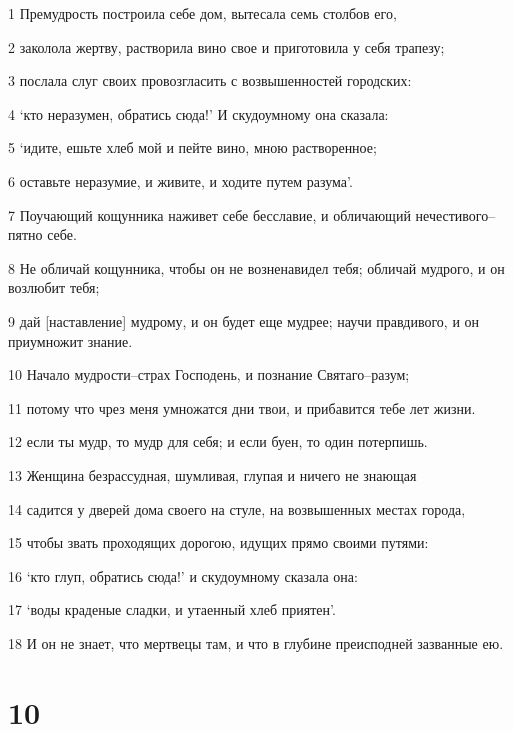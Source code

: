 \par 1 Премудрость построила себе дом, вытесала семь столбов его,
\par 2 заколола жертву, растворила вино свое и приготовила у себя трапезу;
\par 3 послала слуг своих провозгласить с возвышенностей городских:
\par 4 `кто неразумен, обратись сюда!' И скудоумному она сказала:
\par 5 `идите, ешьте хлеб мой и пейте вино, мною растворенное;
\par 6 оставьте неразумие, и живите, и ходите путем разума'.
\par 7 Поучающий кощунника наживет себе бесславие, и обличающий нечестивого--пятно себе.
\par 8 Не обличай кощунника, чтобы он не возненавидел тебя; обличай мудрого, и он возлюбит тебя;
\par 9 дай [наставление] мудрому, и он будет еще мудрее; научи правдивого, и он приумножит знание.
\par 10 Начало мудрости--страх Господень, и познание Святаго--разум;
\par 11 потому что чрез меня умножатся дни твои, и прибавится тебе лет жизни.
\par 12 если ты мудр, то мудр для себя; и если буен, то один потерпишь.
\par 13 Женщина безрассудная, шумливая, глупая и ничего не знающая
\par 14 садится у дверей дома своего на стуле, на возвышенных местах города,
\par 15 чтобы звать проходящих дорогою, идущих прямо своими путями:
\par 16 `кто глуп, обратись сюда!' и скудоумному сказала она:
\par 17 `воды краденые сладки, и утаенный хлеб приятен'.
\par 18 И он не знает, что мертвецы там, и что в глубине преисподней зазванные ею.

\chapter{10}

